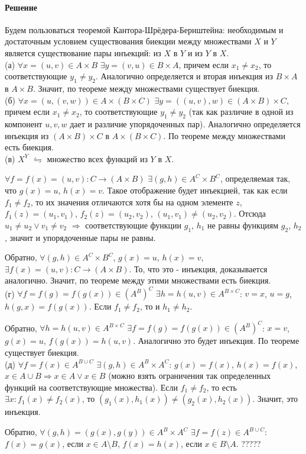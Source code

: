\documentclass[a4paper,12pt]{article}
\begin{document}
\paragraph*{Решение}
Будем пользоваться теоремой Кантора-Шрёдера-Бернштейна: необходимым и достаточным условием существования биекции между множествами $X$ и $Y$ является существование пары инъекций: из $X$ в $Y$ и из $Y$ в $X$.\\	
(а) $\forall x=(u,v) \in A\times B$ $\exists y=(v,u) \in B\times A$, причем если $x_1\ne x_2$, то соответствующие $y_1\ne y_2$. Аналогично определяется и вторая инъекция из $B\times A$ в $A\times B$. Значит, по теореме между множествами существует биекция.\\
(б) $\forall x = (u,(v,w)) \in A\times (B\times C)$ $\exists y=((u,v),w) \in (A\times B)\times C$, причем если $x_1\ne x_2$, то соответствующие $y_1\ne y_2$ (так как различие в одной из компонент $u,v,w$ дает и различие упорядоченных пар). Аналогично определяется инъекция из $(A\times B)\times C$ в $A\times (B\times C)$. По теореме между множествами есть биекция.\\
(в) $X^Y$ $\leftrightharpoons$ множество всех функций из $Y$ в $X$. \par
$\forall f=f(x)=(u,v): C \to (A\times B)$ $\exists (g,h) \in A^C\times B^C$, определяемая так, что $g(x) = u$, $h(x) = v$. Такое отображение будет инъекцией, так как если $f_1\ne f_2$, то их значения отличаются хотя бы на одном элементе $z$, $f_1(z) = (u_1,v_1)$, $f_2(z)=(u_2,v_2)$, $(u_1,v_1)\ne (u_2,v_2)$. Отсюда $u_1\ne u_2 \vee v_1\ne v_2$ $\Rightarrow$ соответствующие функции $g_1$, $h_1$ не равны функциям $g_2$, $h_2$, значит и упорядоченные пары не равны. \par
Обратно, $\forall (g,h) \in A^C\times B^C$, $g(x)=u$, $h(x)=v$, $\exists f(x) = (u,v): C \to (A\times B)$. То, что это - инъекция, доказывается аналогично. Значит, по теореме между этими множествами есть биекция.\\
(г) $\forall f = f(g) = f(g(x)) \in (A^B)^C$ $\exists h=h(u,v) \in A^{B\times C}$: $v=x$, $u = g$, $h(g,x)=f(g(x))$. Если $f_1\ne f_2$, то и $h_1\ne h_2$.\par
Обратно, $\forall h=h(u,v) \in A^{B\times C}$ $\exists f=f(g)=f(g(x)) \in (A^B)^C$: $x=v$, $g(x)=u$, $f(g(x))= h(u,v)$. Аналогично это будет инъекция. По теореме существует биекция.\\
(д) $\forall f=f(x) \in A^{B\cup C}$ $\exists (g,h)\in A^B\times A^C$: $g(x)=f(x)$, $h(x)=f(x)$, $x\in A\cup B \Rightarrow x\in A \vee x\in B$ (можно взять ограничения так определенных функций на соответствующие множества). Если $f_1\ne f_2$, то есть $\exists x: f_1(x)\ne f_2(x)$, то $(g_1(x),h_1(x))\ne (g_2(x),h_2(x))$. Значит, это инъекция. \par
Обратно, $\forall (g,h)=(g(x),g(y))\in A^B\times A^C$ $\exists f=f(z)\in A^{B\cup C}$: $f(x)=g(x)$, если $x\in A\setminus B$, $f(x)=h(x)$, если $x\in B\setminus A$. ?????
\end{document}
